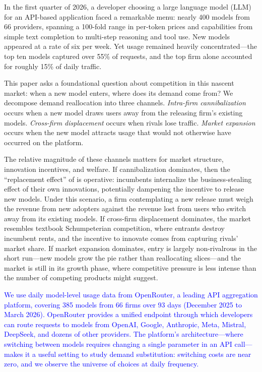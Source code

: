 \documentclass[11pt, a4paper]{article}
\begin{document}
In the first quarter of 2026, a developer choosing a large language model (LLM) for an API-based application faced a remarkable menu: nearly 400 models from 66 providers, spanning a 100-fold range in per-token prices and capabilities from simple text completion to multi-step reasoning and tool use. New models appeared at a rate of six per week. Yet usage remained heavily concentrated---the top ten models captured over 55\% of requests, and the top firm alone accounted for roughly 15\% of daily traffic.

This paper asks a foundational question about competition in this nascent market: when a new model enters, where does its demand come from? We decompose demand reallocation into three channels. \emph{Intra-firm cannibalization} occurs when a new model draws users away from the releasing firm's existing models. \emph{Cross-firm displacement} occurs when rivals lose traffic. \emph{Market expansion} occurs when the new model attracts usage that would not otherwise have occurred on the platform.

The relative magnitude of these channels matters for market structure, innovation incentives, and welfare. If cannibalization dominates, then the ``replacement effect'' of \citet{arrow1962economic} is operative: incumbents internalize the business-stealing effect of their own innovations, potentially dampening the incentive to release new models. Under this scenario, a firm contemplating a new release must weigh the revenue from new adopters against the revenue lost from users who switch away from its existing models. If cross-firm displacement dominates, the market resembles textbook Schumpeterian competition, where entrants destroy incumbent rents, and the incentive to innovate comes from capturing rivals' market share. If market expansion dominates, entry is largely non-rivalrous in the short run---new models grow the pie rather than reallocating slices---and the market is still in its growth phase, where competitive pressure is less intense than the number of competing products might suggest.

\textcolor{blue}{We use daily model-level usage data from OpenRouter, a leading API aggregation platform, covering 385 models from 66 firms over 93 days (December 2025 to March 2026). OpenRouter provides a unified endpoint through which developers can route requests to models from OpenAI, Google, Anthropic, Meta, Mistral, DeepSeek, and dozens of other providers. The platform's architecture---where switching between models requires changing a single parameter in an API call---makes it a useful setting to study demand substitution: switching costs are near zero, and we observe the universe of choices at daily frequency.}
\end{document}
